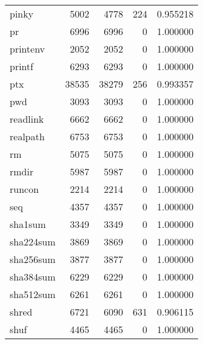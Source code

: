 \begin{tabular}{lrrrr}
pinky     &                     5002 &         4778 &           224 &                 0.955218 \\
pr        &                     6996 &         6996 &             0 &                 1.000000 \\
printenv  &                     2052 &         2052 &             0 &                 1.000000 \\
printf    &                     6293 &         6293 &             0 &                 1.000000 \\
ptx       &                    38535 &        38279 &           256 &                 0.993357 \\
pwd       &                     3093 &         3093 &             0 &                 1.000000 \\
readlink  &                     6662 &         6662 &             0 &                 1.000000 \\
realpath  &                     6753 &         6753 &             0 &                 1.000000 \\
rm        &                     5075 &         5075 &             0 &                 1.000000 \\
rmdir     &                     5987 &         5987 &             0 &                 1.000000 \\
runcon    &                     2214 &         2214 &             0 &                 1.000000 \\
seq       &                     4357 &         4357 &             0 &                 1.000000 \\
sha1sum   &                     3349 &         3349 &             0 &                 1.000000 \\
sha224sum &                     3869 &         3869 &             0 &                 1.000000 \\
sha256sum &                     3877 &         3877 &             0 &                 1.000000 \\
sha384sum &                     6229 &         6229 &             0 &                 1.000000 \\
sha512sum &                     6261 &         6261 &             0 &                 1.000000 \\
shred     &                     6721 &         6090 &           631 &                 0.906115 \\
shuf      &                     4465 &         4465 &             0 &                 1.000000 \\

\end{tabular}
